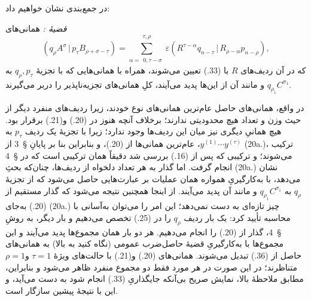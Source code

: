\documentclass[11pt]{article}
\newcommand{\srcLTR}[1]{\relax\ifmmode\text{\mbox{\babelsublr{\foreignlanguage{english}{#1}}}}\else\babelsublr{\foreignlanguage{english}{#1}}\fi}
\providecommand{\pair}[2]{(#1\,|\,#2)}
\providecommand{\eps}{\varepsilon}
\begin{document}
در جمع‌بندی نشان خواهیم داد:

\emph{قضیهٔ \srcLTR{III}:} همانی‌های
\begin{equation}
 \pair{q_\rho A^\sigma}{p_\tau B_{\rho+\sigma-\tau}}
 =\sum_{\alpha=\substack{0,\tau-\sigma}}^{\substack{\tau,\rho}}
 \eps\pair{R^{\tau-\alpha}q_{n-\tau}}{R_{\rho-\alpha}p_{n-\rho}},
\tag{36}
\end{equation}
که در آن ردیف‌های $R$ با (33.) تعیین می‌شوند، همراه با همانی‌هایی که با تجزیهٔ $q_\rho,p_\tau$ به $q_{\rho_1}C^{\sigma_1}$ و مانند آن از این‌ها پدید می‌آیند، کلِ همانی‌های تجزیه‌ناپذیر را دربر می‌گیرند.

در واقع، همانی‌های حاصل عام‌ترین همانی‌های نوع خودند، زیرا ردیف‌های منفرد دیگر از حیث وزن و تعداد هیچ محدودیتی ندارند؛ برخلاف آنچه هنوز در (20.) و(21.) برقرار بود. هیچ همانیِ دیگری نیز میان این ردیف‌ها وجود ندارد؛ زیرا با تجزیهٔ یک ردیف $p_\tau$ به $y^{(1)}\cdots y^{(\tau)}$، عام‌ترین همانی‌ها از (20.)، و بنابراین بنا بر پایانِ \S\ 3 از (20a.)، ترکیب می‌شوند؛ و ترکیبی که پس از (16.) بررسی شد دقیقاً همان ترکیبی است که در \S\ 4 انجام گرفت. اما گذار به هر تعداد دلخواه از ردیف‌ها، چنان‌که بحثِ (20a.) نشان می‌دهد، با به‌کارگیریِ همواره همان عملیات بر عبارت‌هایی حاصل می‌شود که از تجزیهٔ $q_\rho$ به $q_{\rho_1}C^{\sigma_1}$ و مانند آن پدید می‌آیند. از اینجا همچنین نتیجه می‌شود که گذار مستقیم از (20.) به‌جای (20a.) چیز تازه‌ای به دست نمی‌دهد؛ این امر را می‌توان به‌آسانی با محاسبه تأیید کرد: یک بار ردیف $q_\rho$ را در (25.) تخصص می‌دهیم و بار دیگر، به روشِ \S\ 4، گذار از (20.) را انجام می‌دهیم. هر دو بار همان مجموع‌ها پدید می‌آیند و این مجموع‌ها با به‌کارگیریِ قضیهٔ حاصل‌ضرب عمومی (نگاه کنید به بالا) به همانی‌های حاصل از (36.) تبدیل می‌شوند. همانی‌های (20.) و(21.) با حالت‌های ویژهٔ $\tau=1$ و$\rho=1$ متناظرند؛ در این صورت در هر مورد فقط دو مجموع منفرد ظاهر می‌شود و بنابراین، مطابق ملاحظهٔ بالا، نمایش صریح بی‌آنکه جایگذاریِ (33.) انجام شود به دست می‌آید، و این با نتیجهٔ پیشین سازگار است.
\end{document}

